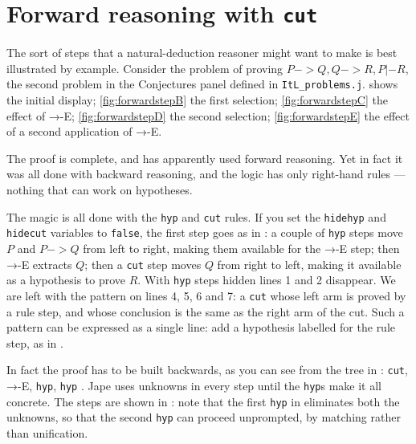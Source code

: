 \section{Forward reasoning with \texttt{cut}}

The sort of steps that a natural-deduction reasoner might want to make is best illustrated by example. Consider the problem of proving $P->Q, Q->R, P |- R$, the second problem in the Conjectures panel defined in \texttt{ItL\_problems.j}.  shows the initial display; \ref{fig:forwardstepB} the first selection; \ref{fig:forwardstepC} the effect of →-E; \ref{fig:forwardstepD} the second selection; \ref{fig:forwardstepE} the effect of a second application of →-E. 

The proof is complete, and has apparently used forward reasoning. Yet in fact it was all done with backward reasoning, and the logic has only right-hand rules --- nothing that can work on hypotheses.

The magic is all done with the \texttt{hyp} and \texttt{cut} rules. If you set the \texttt{hidehyp} and \texttt{hidecut} variables to \texttt{false}, the first step goes as in : a couple of \texttt{hyp} steps move $P$ and $P->Q$ from left to right, making them available for the →-E step; then →-E extracts $Q$; then a \texttt{cut} step moves $Q$ from right to left, making it available as a hypothesis to prove $R$. With \texttt{hyp} steps hidden lines 1 and 2 disappear. We are left with the pattern on lines 4, 5, 6 and 7: a \texttt{cut} whose left arm is proved by a rule step, and whose conclusion is the same as the right arm of the cut. Such a pattern can be expressed as a single line: add a hypothesis labelled for the rule step, as in .

In fact the proof has to be built backwards, as you can see from the tree in : \texttt{cut}, →-E, \texttt{hyp}, \texttt{hyp} . Jape uses unknowns in every step until the \texttt{hyp}s make it all concrete. The steps are shown in : note that the first \texttt{hyp} in  eliminates both the unknowns, so that the second \texttt{hyp} can proceed unprompted, by matching rather than unification.

